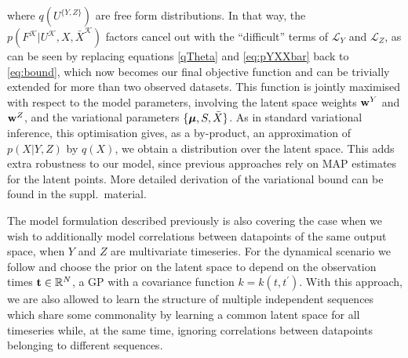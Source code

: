 where $q(U^{\{Y,Z\}})$ are free form distributions.  In that way, the
$p(F^\mathcal{K}|U^\mathcal{K},X,\bar{X}^\mathcal{K})$ factors cancel
out with the ``difficult'' terms of $\mathcal{L}_Y $ and
$\mathcal{L}_Z$, as can be seen by replacing equations \eqref{qTheta}
and \eqref{eq:pYXXbar} back to \eqref{eq:bound}, which now becomes our
final objective function and can be trivially extended for more than
two observed datasets. This function is jointly maximised with respect
to the model parameters, involving the latent space weights $\mathbf{w}^Y$
and $\mathbf{w}^Z$, and the variational parameters $\{\boldsymbol \mu, S,
\bar{X}\}$. As in standard variational inference, this optimisation
gives, as a by-product, an approximation of $p(X|Y,Z)$ by $q(X)$, \ie
we obtain a distribution over the latent space. This adds extra
robustness to our model, since previous approaches rely on MAP
estimates for the latent points. More detailed derivation of the
variational bound can be found in the suppl.\ material.


The model formulation described previously is also
covering the case when we wish to additionally model correlations
between datapoints of the same output space, \eg when $Y$ and $Z$ are
multivariate timeseries. For the dynamical scenario we follow
\citet{Damianou:vgpds11,Lawrence:hgplvm07} and choose the prior on the
latent space to depend on the observation times $\mathbf{t} \in \mathbb{R}^N$, \eg a GP with a covariance function $k =
k(t,t^\prime)$. With this approach, we are also allowed to learn the
structure of multiple independent sequences which share some commonality by
learning a common latent space for all timeseries while, at the same
time, ignoring correlations between datapoints belonging to
different sequences.





